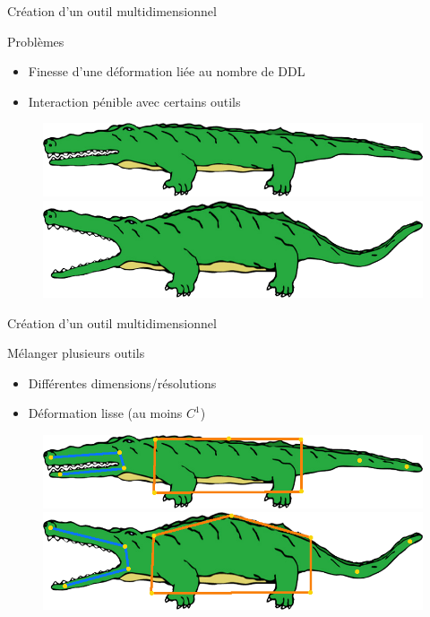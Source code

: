 \documentclass[xcolor=x11names,compress]{beamer}
\renewcommand{\(}{\begin{columns}} \renewcommand{\)}{\end{columns}}
\newcommand{\<}[1]{\begin{column}{#1}} \renewcommand{\>}{\end{column}}
\begin{document}
\begin{frame}{Création d'un outil multidimensionnel}
  \begin{alertblock}{Problèmes}
    \begin{itemize}
    \item Finesse d'une déformation liée au nombre de DDL
    \item Interaction pénible avec certains outils
    \end{itemize}
  \end{alertblock}
  \begin{figure}[h]
    \begin{center}
      \includegraphics[scale=0.15]{alligator-ferme}
      \includegraphics[scale=0.15]{alligator-ouvert}
    \end{center}
    \caption{\cite{JBPS11}}
  \end{figure}
\end{frame}

\begin{frame}{Création d'un outil multidimensionnel}
  \begin{block}{Mélanger plusieurs outils}
    \begin{itemize}
    \item Différentes dimensions/résolutions
    \item Déformation lisse (au moins $C^1$)
    \end{itemize}
  \end{block}
  \begin{figure}[h]
    \begin{center}
      \includegraphics[scale=0.15]{alligator-avant}
      \includegraphics[scale=0.15]{alligator-apres}
    \end{center}
    \caption{\cite{JBPS11}}
  \end{figure}
\end{frame}
\end{document}
